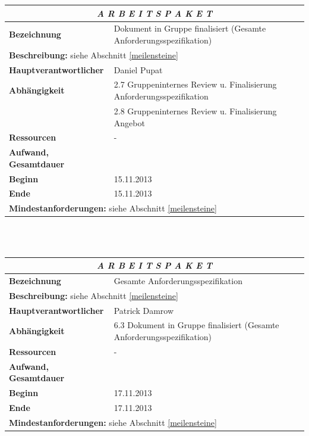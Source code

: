 \documentclass[fontsize=12pt,paper=a4,twoside]{scrartcl}
\begin{document}
\begin{tabular}{p{7.5cm}|p{7.5cm}}\toprule
\multicolumn{2}{c}{\textbf{\textit{A R B E I T S P A K E T \quad 6.3}}} \\ \toprule \hline
\textbf{Bezeichnung} & Dokument in Gruppe finalisiert (Gesamte Anforderungsspezifikation)\\\hline
\multicolumn{2}{p{15cm}}{\textbf{Beschreibung:} \newline 
siehe Abschnitt \ref{meilensteine} }  \\\hline
\textbf{Hauptverantwortlicher} & Daniel Pupat \\\hline
\textbf{Abhängigkeit} & 2.7 Gruppeninternes Review u. Finalisierung Anforderungsspezifikation \\
& 2.8 Gruppeninternes Review u. Finalisierung Angebot\\\hline
\textbf{Ressourcen} & -\\\hline
\textbf{Aufwand, Gesamtdauer} & \\\hline
\textbf{Beginn} & 15.11.2013 \\\hline
\textbf{Ende} & 15.11.2013\\\hline
\multicolumn{2}{p{15cm}}{\textbf{Mindestanforderungen: } \newline
siehe Abschnitt \ref{meilensteine}}  \\ \toprule
\end{tabular} \\\\

\begin{tabular}{p{7.5cm}|p{7.5cm}}\toprule
\multicolumn{2}{c}{\textbf{\textit{A R B E I T S P A K E T \quad 6.4}}} \\ \toprule \hline
\textbf{Bezeichnung} & Gesamte Anforderungsspezifikation\\\hline
\multicolumn{2}{p{15cm}}{\textbf{Beschreibung:} \newline 
siehe Abschnitt \ref{meilensteine} }  \\\hline
\textbf{Hauptverantwortlicher} & Patrick Damrow \\\hline
\textbf{Abhängigkeit} & 6.3 Dokument in Gruppe finalisiert (Gesamte Anforderungsspezifikation)\\\hline
\textbf{Ressourcen} & -\\\hline
\textbf{Aufwand, Gesamtdauer} & \\\hline
\textbf{Beginn} & 17.11.2013 \\\hline
\textbf{Ende} & 17.11.2013\\\hline
\multicolumn{2}{p{15cm}}{\textbf{Mindestanforderungen: } \newline
siehe Abschnitt \ref{meilensteine}}  \\ \toprule
\end{tabular} \\\\
\end{document}
